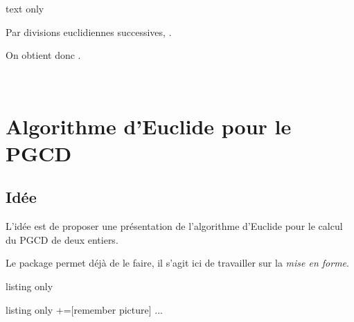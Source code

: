 \begin{PresCodeSortiePL}{text only}

\medskip

Par divisions euclidiennes successives, .

\medskip


\medskip

On obtient donc .

\vspace{1.5cm}

~
\end{PresCodeSortiePL}

\newpage

\section{Algorithme d'Euclide pour le PGCD}\label{prespgcd}

\subsection{Idée}

\begin{tipblock}
L'idée est de proposer une \og présentation \fg{} de l'algorithme d'Euclide pour le calcul du PGCD de deux entiers.

Le package  permet déjà de le faire, il s'agit ici de travailler sur la \textit{mise en forme}.
\end{tipblock}

\begin{PresCodeTexPL}{listing only}
\end{PresCodeTexPL}

\begin{PresCodeTexPL}{listing only}
+=[remember picture]
...
\end{PresCodeTexPL}

\begin{PresCodePL}{}
\end{PresCodePL}

